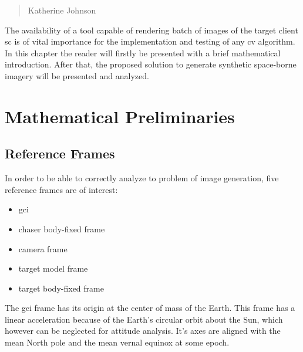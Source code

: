 \begin{quotation}
  {\footnotesize
    \begin{flushright}
      Katherine Johnson
    \end{flushright}
  }
\end{quotation}
\vspace{0.5cm}

The availability of a tool capable of rendering batch of images of the target client \acrshort{sc} is of vital importance for the implementation and testing of any \acrshort{cv} algorithm. In this chapter the reader will firstly be presented with a brief mathematical introduction. After that, the proposed solution to generate synthetic space-borne imagery will be presented and analyzed. 

\section{Mathematical Preliminaries}

\subsection{Reference Frames}
In order to be able to correctly analyze to problem of image generation, five reference frames are of interest:
\begin{itemize}
  \item \acrfull{gci}
  \item chaser body-fixed frame
  \item camera frame
  \item target model frame
  \item target body-fixed frame
\end{itemize}

The \acrshort{gci} frame has its origin at the center of mass of the Earth. This frame has a linear acceleration because of the Earth's circular orbit about the Sun, which however can be neglected for attitude analysis.
It's axes are aligned with the mean North pole and the mean vernal equinox at some epoch.\\

